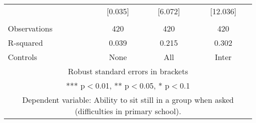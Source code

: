 \begin{tabular}{lccc}
 & [0.035] & [6.072] & [12.036] \\
 &  &  &  \\
Observations & 420 & 420 & 420 \\
R-squared & 0.039 & 0.215 & 0.302 \\
 Controls & None & All & Inter \\ \hline
\multicolumn{4}{c}{ Robust standard errors in brackets} \\
\multicolumn{4}{c}{ *** p$<$0.01, ** p$<$0.05, * p$<$0.1} \\
\multicolumn{4}{c}{ Dependent variable: Ability to sit still in a group when asked (difficulties in primary school).} \\
\end{tabular}
